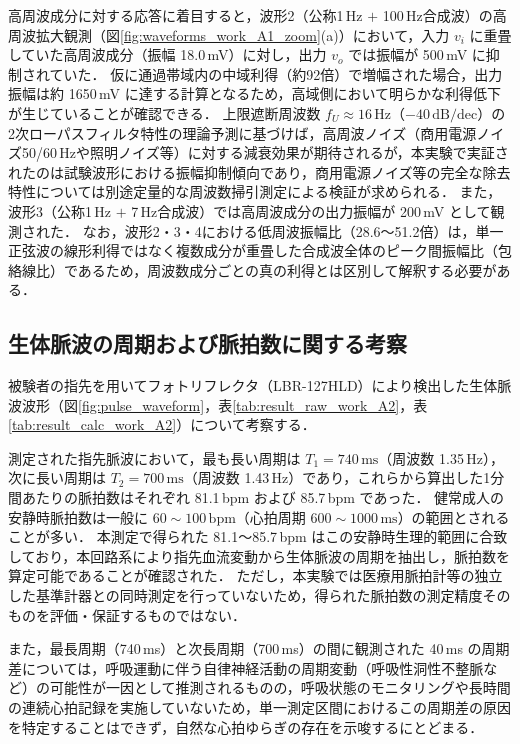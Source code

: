 高周波成分に対する応答に着目すると，波形2（公称1\,Hz $+$ 100\,Hz合成波）の高周波拡大観測（図\ref{fig:waveforms_work_A1_zoom}(a)）において，入力 $v_i$ に重畳していた高周波成分（振幅 18.0\,mV）に対し，出力 $v_o$ では振幅が 500\,mV に抑制されていた．
仮に通過帯域内の中域利得（約92倍）で増幅された場合，出力振幅は約 1650\,mV に達する計算となるため，高域側において明らかな利得低下が生じていることが確認できる．
上限遮断周波数 $f_U \approx 16\,\mathrm{Hz}$（$-40\,\mathrm{dB/dec}$）の2次ローパスフィルタ特性の理論予測に基づけば，高周波ノイズ（商用電源ノイズ50/60\,Hzや照明ノイズ等）に対する減衰効果が期待されるが，本実験で実証されたのは試験波形における振幅抑制傾向であり，商用電源ノイズ等の完全な除去特性については別途定量的な周波数掃引測定による検証が求められる．
また，波形3（公称1\,Hz $+$ 7\,Hz合成波）では高周波成分の出力振幅が 200\,mV として観測された．
なお，波形2・3・4における低周波振幅比（28.6〜51.2倍）は，単一正弦波の線形利得ではなく複数成分が重畳した合成波全体のピーク間振幅比（包絡線比）であるため，周波数成分ごとの真の利得とは区別して解釈する必要がある．


\subsection{生体脈波の周期および脈拍数に関する考察}

被験者の指先を用いてフォトリフレクタ（LBR-127HLD）により検出した生体脈波波形（図\ref{fig:pulse_waveform}，表\ref{tab:result_raw_work_A2}，表\ref{tab:result_calc_work_A2}）について考察する．

測定された指先脈波において，最も長い周期は $T_1 = 740\,\mathrm{ms}$（周波数 1.35\,Hz），次に長い周期は $T_2 = 700\,\mathrm{ms}$（周波数 1.43\,Hz）であり，これらから算出した1分間あたりの脈拍数はそれぞれ 81.1\,bpm および 85.7\,bpm であった．
健常成人の安静時脈拍数は一般に $60 \sim 100\,\mathrm{bpm}$（心拍周期 $600 \sim 1000\,\mathrm{ms}$）の範囲とされることが多い．
本測定で得られた 81.1〜85.7\,bpm はこの安静時生理的範囲に合致しており，本回路系により指先血流変動から生体脈波の周期を抽出し，脈拍数を算定可能であることが確認された．
ただし，本実験では医療用脈拍計等の独立した基準計器との同時測定を行っていないため，得られた脈拍数の測定精度そのものを評価・保証するものではない．

また，最長周期（740\,ms）と次長周期（700\,ms）の間に観測された 40\,ms の周期差については，呼吸運動に伴う自律神経活動の周期変動（呼吸性洞性不整脈など）の可能性が一因として推測されるものの，呼吸状態のモニタリングや長時間の連続心拍記録を実施していないため，単一測定区間におけるこの周期差の原因を特定することはできず，自然な心拍ゆらぎの存在を示唆するにとどまる．


